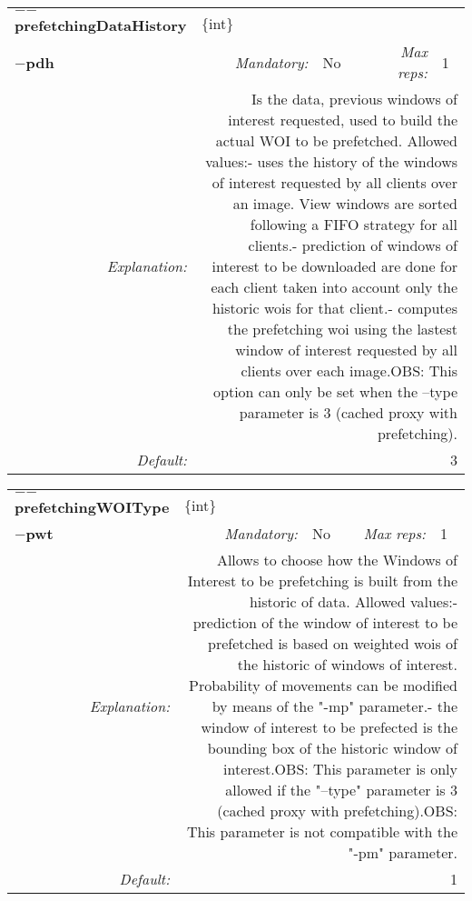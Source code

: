 \begin{center}\begin{tabular}{|rr|rl|rl|}
\hline
\multicolumn{2}{|l|}{\textbf{$-$$-$prefetchingDataHistory}} & \multicolumn{4}{|l|}{$\{$int$\}$} \\
\cline{3-6}
\multicolumn{2}{|l|}{\textbf{$-$pdh}} & \emph{Mandatory:} & No & \emph{Max reps:} & 1 \\
\hline
\emph{Explanation:} & \multicolumn{5}{|p{12cm}|}{Is the data, previous windows of interest requested, used to build the actual WOI to be prefetched. Allowed values:\newline	1- uses the history of the windows of interest requested by all clients over an image. View windows are sorted following a FIFO strategy for all clients.\newline	2- prediction of windows of interest to be downloaded are done for each client taken into account only the historic wois for that client.\newline	3- computes the prefetching woi using the lastest window of interest requested by all clients over each image.\newline 	OBS: This option can only be set when the --type parameter is 3 (cached proxy with prefetching).} \\
\hline
\emph{Default:} & \multicolumn{5}{|p{12cm}|}{3} \\
\hline
\end{tabular}\end{center}
\begin{center}\begin{tabular}{|rr|rl|rl|}
\hline
\multicolumn{2}{|l|}{\textbf{$-$$-$prefetchingWOIType}} & \multicolumn{4}{|l|}{$\{$int$\}$} \\
\cline{3-6}
\multicolumn{2}{|l|}{\textbf{$-$pwt}} & \emph{Mandatory:} & No & \emph{Max reps:} & 1 \\
\hline
\emph{Explanation:} & \multicolumn{5}{|p{12cm}|}{Allows to choose how the Windows of Interest to be prefetching is built from the historic of data. Allowed values:\newline	1- prediction of the window of interest to be prefetched  is based on weighted wois of the historic of windows of interest. Probability of movements can be modified by means of the "-mp" parameter.\newline	2- the window of interest to be prefected is the bounding box of the historic window of interest.\newline OBS: This parameter is only allowed if the "--type" parameter is 3 (cached proxy with prefetching).\newline OBS: This parameter is not compatible with the "-pm" parameter.} \\
\hline
\emph{Default:} & \multicolumn{5}{|p{12cm}|}{1} \\
\hline
\end{tabular}\end{center}
